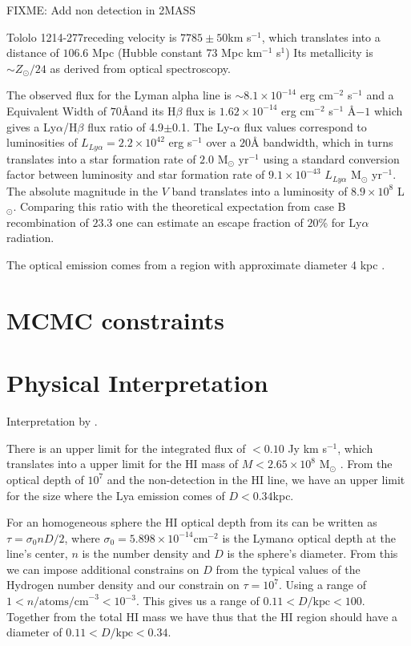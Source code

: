 \documentclass[a4paper, usenatbib, 12pt]{article}
\newcommand{\tol}{Tololo 1214-277}
\begin{document}
{FIXME: Add non detection in 2MASS %

\tol receding velocity is $7785\pm 50$km s$^{-1}$, which translates
into a distance of $106.6$ Mpc (Hubble constant 73 Mpc km$^{-1}$
s$^{1}$)
Its metallicity is $\sim Z_{\odot}/24$ \cite{Izotov04} as derived from optical
spectroscopy. 


The observed flux for the Lyman alpha line is $\sim
8.1\times 10^{-14}$ erg cm$^{-2}$ s$^{-1}$ \cite{Thuan97}
and a Equivalent Width of $70$\AA and its H$\beta$ flux is 
$1.62\times 10^{-14}$ erg cm$^{-2}$ s$^{-1}$ \AA${-1}$
\cite{Izotov04} which gives a Ly$\alpha$/H$\beta$ flux ratio of
4.9$\pm$0.1. The Ly-$\alpha$ flux values correspond to luminosities of
$L_{Ly\alpha}=2.2\times 10^{42}$ erg s$^{-1}$ over a $20$\AA
bandwidth, which in turns translates  into a star formation rate of
$2.0$ M$_{\odot}$ yr$^{-1}$ using a standard conversion factor between
luminosity and star formation rate of $9.1\times 10^{-43}$
$L_{Ly\alpha}$ M$_{\odot}$ yr$^{-1}$. 
The absolute magnitude in the $V$ band translates into a luminosity of
$8.9\times 10^{8}$ L$_{\odot}$.
Comparing this ratio with the theoretical expectation from case B
recombination of $23.3$ \cite{Hummer1987} one can estimate an escape
fraction of $20$\% for Ly$\alpha$ radiation.

The optical emission  comes from a   region with approximate diameter
4 kpc \cite{Fricke01}. 

\section*{MCMC constraints}

\section*{Physical Interpretation}

Interpretation by \cite{mashesse03}.

There is an upper limit for the  
integrated flux of $<0.10$ Jy km s$^{-1}$, which translates into a
upper limit for the HI mass of $M<2.65\times 10^{8}$ M$_{\odot}$
\cite{pustilnikmartin07}. 
From the optical depth of $10^7$ and the non-detection in the HI line,
we have an upper limit for the size where the Lya emission comes of
$D<0.34$kpc. 

 For an homogeneous sphere the HI optical depth from its can be
 written as $\tau = \sigma_0 n D/2$, where $\sigma_0=5.898\times
10^{-14}$cm$^{-2}$ is the Lyman$\alpha$  optical depth at the 
line's center, $n$ is the number density and $D$ is the sphere's
diameter. 
From this we can impose additional constrains on $D$ from the typical
values of the Hydrogen number density and our constrain on
$\tau=10^{7}$.  Using a range of $1<n/\mathrm{atoms/cm}^{-3} <
10^{-3}$. This gives us a range of $0.11 < D/\mathrm{kpc}<100$. 
Together from the total HI mass we have thus that the HI region should
have a diameter of $0.11 < D/\mathrm{kpc}<0.34$.



}
\end{document}
